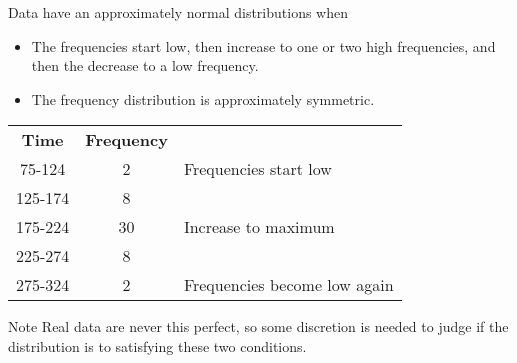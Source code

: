 \documentclass{beamer}
\begin{document}
\begin{frame}
\begin{definition}
Data have an approximately normal distributions when
\begin{itemize}
\item The frequencies start low, then increase to one or two high frequencies, and then the decrease to a low frequency.
\item The frequency distribution is approximately symmetric.
\end{itemize}
\end{definition}\pause

\begin{example}
\begin{center}
\begin{tabular}{ccl}
\textbf{Time} & \textbf{Frequency} & \\
75-124 & 2 & Frequencies start low \\
125-174 & 8 & \\
175-224 & 30 & Increase to maximum \\
225-274 & 8 & \\
275-324 & 2 & Frequencies become low again
\end{tabular}
\end{center}
\end{example}\pause

\begin{block}{Note}
Real data are never this perfect, so some discretion is needed to judge if the distribution is  to satisfying these two conditions.
\end{block}
\end{frame}
\end{document}
